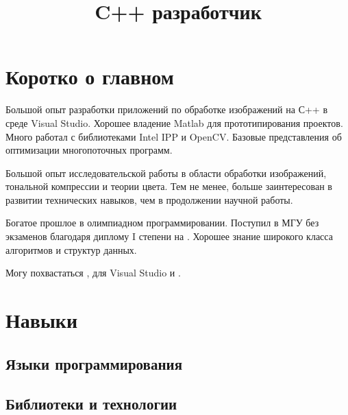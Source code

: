 \documentclass[11pt,a4paper,final]{moderncv}
\title{C++ разработчик}                               %
\begin{document}
\maketitle

\section{Коротко о главном}

Большой опыт разработки приложений по обработке изображений на С++ в среде Visual Studio. Хорошее владение Matlab для прототипирования проектов. Много работал с библиотеками Intel IPP и OpenCV. Базовые представления об оптимизации многопоточных программ.

Большой опыт исследовательской работы в области обработки изображений, тональной компрессии и теории цвета. Тем не менее, больше заинтересован в развитии технических навыков, чем в продолжении научной работы.

Богатое прошлое в олимпиадном программировании. Поступил в МГУ без экзаменов благодаря диплому I степени на . Хорошее знание широкого класса алгоритмов и структур данных.

Могу похвастаться ,  для Visual Studio и .

\section{Навыки}

\subsection{Языки программирования}


\subsection{Библиотеки и технологии}

\end{document}
